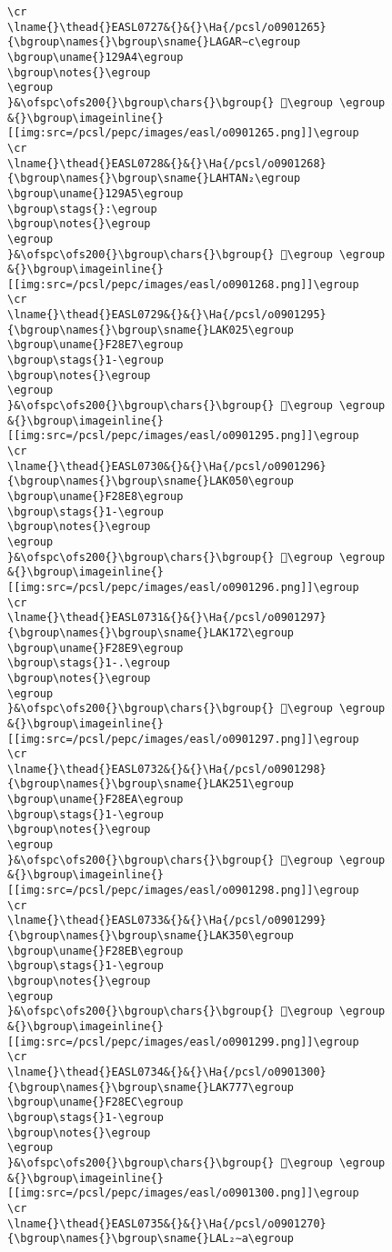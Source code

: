 \begin{verbatim}
\cr
\lname{}\thead{}EASL0727&{}&{}\Ha{/pcsl/o0901265}{\bgroup\names{}\bgroup\sname{}LAGAR∼c\egroup
\bgroup\uname{}129A4\egroup
\bgroup\notes{}\egroup
\egroup
}&\ofspc\ofs200{}\bgroup\chars{}\bgroup{} 𒦤\egroup \egroup
&{}\bgroup\imageinline{}[[img:src=/pcsl/pepc/images/easl/o0901265.png]]\egroup
\cr
\lname{}\thead{}EASL0728&{}&{}\Ha{/pcsl/o0901268}{\bgroup\names{}\bgroup\sname{}LAHTAN₂\egroup
\bgroup\uname{}129A5\egroup
\bgroup\stags{}:\egroup
\bgroup\notes{}\egroup
\egroup
}&\ofspc\ofs200{}\bgroup\chars{}\bgroup{} 𒦥\egroup \egroup
&{}\bgroup\imageinline{}[[img:src=/pcsl/pepc/images/easl/o0901268.png]]\egroup
\cr
\lname{}\thead{}EASL0729&{}&{}\Ha{/pcsl/o0901295}{\bgroup\names{}\bgroup\sname{}LAK025\egroup
\bgroup\uname{}F28E7\egroup
\bgroup\stags{}1-\egroup
\bgroup\notes{}\egroup
\egroup
}&\ofspc\ofs200{}\bgroup\chars{}\bgroup{} 󲣧\egroup \egroup
&{}\bgroup\imageinline{}[[img:src=/pcsl/pepc/images/easl/o0901295.png]]\egroup
\cr
\lname{}\thead{}EASL0730&{}&{}\Ha{/pcsl/o0901296}{\bgroup\names{}\bgroup\sname{}LAK050\egroup
\bgroup\uname{}F28E8\egroup
\bgroup\stags{}1-\egroup
\bgroup\notes{}\egroup
\egroup
}&\ofspc\ofs200{}\bgroup\chars{}\bgroup{} 󲣨\egroup \egroup
&{}\bgroup\imageinline{}[[img:src=/pcsl/pepc/images/easl/o0901296.png]]\egroup
\cr
\lname{}\thead{}EASL0731&{}&{}\Ha{/pcsl/o0901297}{\bgroup\names{}\bgroup\sname{}LAK172\egroup
\bgroup\uname{}F28E9\egroup
\bgroup\stags{}1-.\egroup
\bgroup\notes{}\egroup
\egroup
}&\ofspc\ofs200{}\bgroup\chars{}\bgroup{} 󲣩\egroup \egroup
&{}\bgroup\imageinline{}[[img:src=/pcsl/pepc/images/easl/o0901297.png]]\egroup
\cr
\lname{}\thead{}EASL0732&{}&{}\Ha{/pcsl/o0901298}{\bgroup\names{}\bgroup\sname{}LAK251\egroup
\bgroup\uname{}F28EA\egroup
\bgroup\stags{}1-\egroup
\bgroup\notes{}\egroup
\egroup
}&\ofspc\ofs200{}\bgroup\chars{}\bgroup{} 󲣪\egroup \egroup
&{}\bgroup\imageinline{}[[img:src=/pcsl/pepc/images/easl/o0901298.png]]\egroup
\cr
\lname{}\thead{}EASL0733&{}&{}\Ha{/pcsl/o0901299}{\bgroup\names{}\bgroup\sname{}LAK350\egroup
\bgroup\uname{}F28EB\egroup
\bgroup\stags{}1-\egroup
\bgroup\notes{}\egroup
\egroup
}&\ofspc\ofs200{}\bgroup\chars{}\bgroup{} 󲣫\egroup \egroup
&{}\bgroup\imageinline{}[[img:src=/pcsl/pepc/images/easl/o0901299.png]]\egroup
\cr
\lname{}\thead{}EASL0734&{}&{}\Ha{/pcsl/o0901300}{\bgroup\names{}\bgroup\sname{}LAK777\egroup
\bgroup\uname{}F28EC\egroup
\bgroup\stags{}1-\egroup
\bgroup\notes{}\egroup
\egroup
}&\ofspc\ofs200{}\bgroup\chars{}\bgroup{} 󲣬\egroup \egroup
&{}\bgroup\imageinline{}[[img:src=/pcsl/pepc/images/easl/o0901300.png]]\egroup
\cr
\lname{}\thead{}EASL0735&{}&{}\Ha{/pcsl/o0901270}{\bgroup\names{}\bgroup\sname{}LAL₂∼a\egroup

\end{verbatim}
